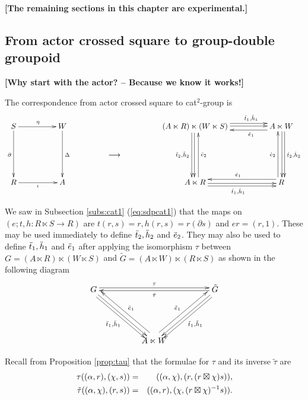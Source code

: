 \newpage
\noindent
{\bf [The remaining sections in this chapter are experimental.]}

\bigskip
\subsection{From actor crossed square to group-double groupoid}

{\bf [Why start with the actor? -- Because we know it works!]}

\bigskip\noindent
The correspondence from actor crossed square to cat$^2$-group is
$$
\xymatrix @C=4.0pc @R=2.0pc{
S \ar[r]^{\eta} \ar[dd]_{\partial}
  & W \ar[dd]^{\Delta} 
    & & (A \ltimes R)\ltimes(W \ltimes S) 
        \ar[r]<1.0ex>^(0.65){\ddtto,\ddhho} \ar[r]<0.2ex>
        \ar[dd]<-1.0ex>_{\ddttt,\ddhht} \ar[dd]<-0.2ex>
        & A \ltimes W  \ar[l]<1.0ex>^(0.35){\ddeeo} 
                       \ar[dd]<1.0ex>^{\dttt,\dhht} \ar[dd]<0.2ex>\\
  & & \longrightarrow
      & & \\
R \ar[r]_{\iota}
  & A
    & & A \ltimes R \ar[r]<-1.0ex>_{\dtto,\dhho} \ar[r]<-0.2ex>
                    \ar[uu]<-1.0ex>_{\ddeet}
        & R \ar[l]<-1.0ex>_{\deeo}  \ar[uu]<1.0ex>^{\deet}
}
$$

We saw in Subsection \ref{subs:cat1} (\ref{eq:sdpcat1}) that the maps on 
$(e;t,h: R \ltimes S \to R)$ are 
$t(r,s)=r, h(r,s)=r(\partial s)$ and $er = (r,1)$.
These may be used immediately to define $\ddot{t}_2,\ddot{h}_2$ and $\ddot{e}_2$.
They may also be used to define $\ddot{t}_1, \ddot{h}_1$ and $\ddot{e}_1$ 
after applying the isomorphism $\tau$
between $G = (A \ltimes R)\ltimes(W \ltimes S)$ 
and $\tilde{G} = (A \ltimes W)\ltimes(R \ltimes S)$ 
as shown in the following diagram
$$
\xymatrix @C=4.0pc @R=4.0pc{
G \ar[rr]<0.6ex>^{\tau}
  \ar[dr]<-0.2ex> \ar[dr]<-1.0ex>_{\ddtto,\ddhho}
  & & \tilde{G} \ar[dl]<0.2ex> \ar[dl]<1.0ex>^{\tilde{t}_1,\tilde{h}_1} 
                \ar[ll]<0.2ex>^{\tilde{\tau}} \\
  & A \ltimes W \ar[ul]<-1.0ex>_{\ddeeo} \ar[ur]<1.0ex>^{\tilde{e}_1}
    & \\
}
$$

\bigskip\noindent
Recall from Proposition \ref{prop:tau} that the formulae for $\tau$ 
and its inverse $\tilde{\tau}$ are
\begin{eqnarray*}
\tau((\alpha,r),(\chi,s))
 & = &  ((\alpha,\chi),(r,(r \boxtimes \chi)s)), \\
\tilde{\tau}((\alpha,\chi),(r,s)) 
 & = &  ((\alpha,r),(\chi,(r \boxtimes \chi)^{-1}s)). 
\end{eqnarray*}

